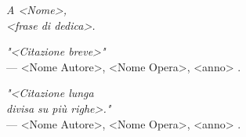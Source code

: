 \thispagestyle{empty}

\begin{flushright}

\vfill 

\textit{A <Nome>, \\
<frase di dedica>.}

\vfill

\emph{"<Citazione breve>"} \\ 
--- <Nome Autore>, <Nome Opera>, <anno> \cite{valery1920marin}.

\vfill 
\vfill
\vfill
\vfill

\end{flushright}

\newpage
\thispagestyle{empty}

\begin{flushright}

\emph{"<Citazione lunga \\
divisa su più righe>."} \\
--- <Nome Autore>, <Nome Opera>, <anno> \cite{knuth1991theory}.

\end{flushright}